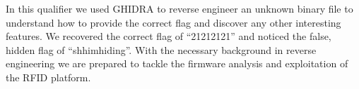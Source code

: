 In this qualifier we used GHIDRA to reverse engineer an unknown binary file to understand how to provide the correct flag and discover any other interesting features. We recovered the correct flag of ``21212121'' and noticed the false, hidden flag of ``shhimhiding''. With the necessary background in reverse engineering we are prepared to tackle the firmware analysis and exploitation of the RFID platform.
